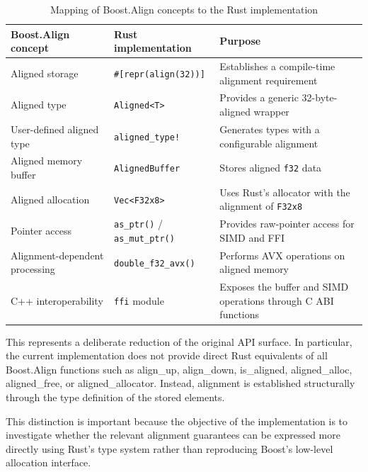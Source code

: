 \begin{table}[H]
\centering
\renewcommand{\arraystretch}{1.2}
{\small
\begin{tabularx}{\textwidth}{|X|X|X|}
\hline
\textbf{Boost.Align concept} & \textbf{Rust implementation} & \textbf{Purpose} \\ \hline

Aligned storage
& \lstinline|#[repr(align(32))]|
& Establishes a compile-time alignment requirement \\ \hline

Aligned type
& \lstinline|Aligned<T>|
& Provides a generic 32-byte-aligned wrapper \\ \hline

User-defined aligned type
& \lstinline|aligned_type!|
& Generates types with a configurable alignment \\ \hline

Aligned memory buffer
& \lstinline|AlignedBuffer|
& Stores aligned \texttt{f32} data \\ \hline

Aligned allocation
& \lstinline|Vec<F32x8>|
& Uses Rust's allocator with the alignment of \lstinline|F32x8| \\ \hline

Pointer access
& \lstinline|as_ptr()| / \lstinline|as_mut_ptr()|
& Provides raw-pointer access for SIMD and FFI \\ \hline

Alignment-dependent processing
& \lstinline|double_f32_avx()|
& Performs AVX operations on aligned memory \\ \hline

C++ interoperability
& \lstinline|ffi| module
& Exposes the buffer and SIMD operations through C ABI functions \\ \hline

\end{tabularx}
}
\caption{Mapping of Boost.Align concepts to the Rust implementation}
\label{tab:boost-align-rust-mapping}
\end{table}


This represents a deliberate reduction of the original API surface. 
In particular, the current implementation does not provide direct Rust equivalents of all Boost.Align functions such as 
align\_up, align\_down, is\_aligned, aligned\_alloc, aligned\_free, or aligned\_allocator. 
Instead, alignment is established structurally through the type definition of the stored elements.

This distinction is important because the objective of the implementation is to investigate whether the relevant alignment guarantees 
can be expressed more directly using Rust's type system rather than reproducing Boost's low-level allocation interface.

